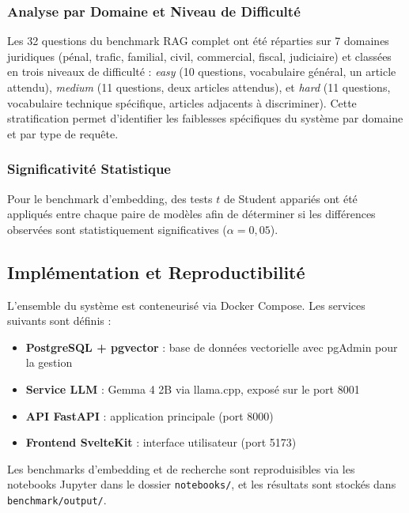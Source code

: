 \subsubsection{Analyse par Domaine et Niveau de Difficulté}

Les 32 questions du benchmark RAG complet ont été réparties sur 7 domaines
juridiques (pénal, trafic, familial, civil, commercial, fiscal, judiciaire)
et classées en trois niveaux de difficulté : \textit{easy} (10 questions,
vocabulaire général, un article attendu), \textit{medium} (11 questions,
deux articles attendus), et \textit{hard} (11 questions, vocabulaire technique
spécifique, articles adjacents à discriminer). Cette stratification permet
d'identifier les faiblesses spécifiques du système par domaine et par type
de requête.

\subsubsection{Significativité Statistique}

Pour le benchmark d'embedding, des tests $t$ de Student appariés ont été
appliqués entre chaque paire de modèles afin de déterminer si les différences
observées sont statistiquement significatives ($\alpha = 0,05$).

\subsection{Implémentation et Reproductibilité}

L'ensemble du système est conteneurisé via Docker Compose. Les services
suivants sont définis :

\begin{itemize}
    \item \textbf{PostgreSQL + pgvector} : base de données vectorielle
    avec pgAdmin pour la gestion
    \item \textbf{Service LLM} : Gemma 4 2B via llama.cpp, exposé sur
    le port 8001
    \item \textbf{API FastAPI} : application principale (port 8000)
    \item \textbf{Frontend SvelteKit} : interface utilisateur (port 5173)
\end{itemize}

Les benchmarks d'embedding et de recherche sont reproduisibles via les
notebooks Jupyter dans le dossier \texttt{notebooks/}, et les résultats
sont stockés dans \texttt{benchmark/output/}.
